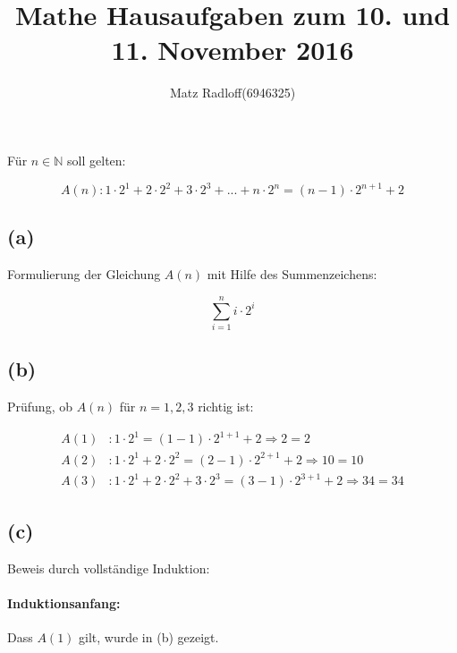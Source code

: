 \documentclass[11pt,a4paper]{article}
\title{\textbf{Mathe Hausaufgaben zum 10. und 11. November 2016}}
\author{Matz Radloff(6946325)}
\begin{document}
  \maketitle
  \date{}
  \tableofcontents
  \newpage

\section{}

Für $n \in \mathbb{N}$ soll gelten:

\begin{equation*}
    A(n): 1 \cdot 2^1 + 2 \cdot 2^2 + 3 \cdot 2^3 + ... + n \cdot 2^n = (n-1) \cdot 2^{n+1} + 2
\end{equation*}

\subsection*{(a)} Formulierung der Gleichung $A(n)$ mit Hilfe des Summenzeichens:

\begin{equation*}
    \sum_{i=1}^{n}{i \cdot 2^i}
\end{equation*}

\subsection*{(b)} Prüfung, ob $A(n)$ für $n = 1, 2, 3$ richtig ist:

\begin{align*}
    A(1) &: 1 \cdot 2^1 = (1-1) \cdot 2^{1+1}+2 \Rightarrow 2 = 2 \tag*{\checkmark}\\
    A(2) &: 1 \cdot 2^1 + 2 \cdot 2^2 = (2-1) \cdot 2^{2+1}+2 \Rightarrow 10 = 10 \tag*{\checkmark}\\
    A(3) &: 1 \cdot 2^1 + 2 \cdot 2^2 + 3 \cdot 2^3 = (3-1) \cdot 2^{3+1}+2 \Rightarrow 34 = 34 \tag*{\checkmark}
\end{align*}

\subsection*{(c)} Beweis durch vollständige Induktion:

\paragraph{Induktionsanfang:}
Dass $A(1)$ gilt, wurde in (b) gezeigt.
\end{document}
